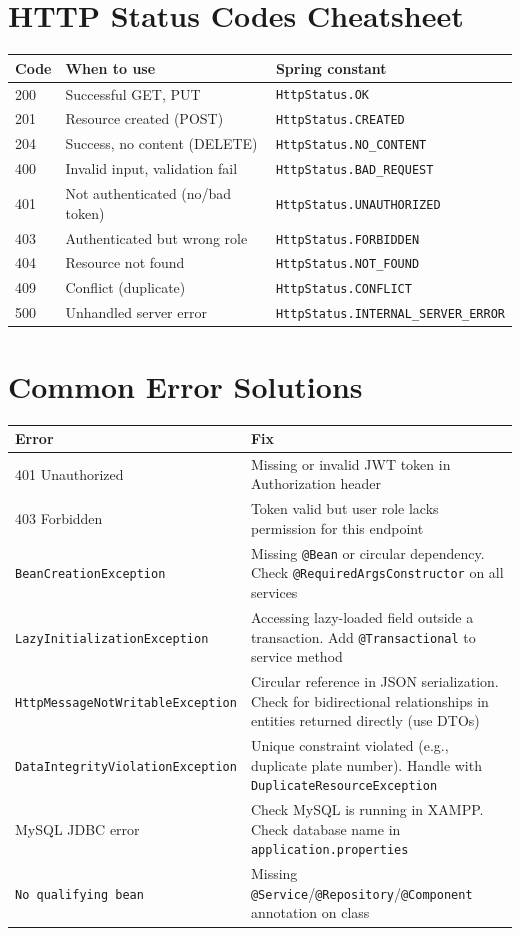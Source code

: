 \documentclass[12pt,a4paper]{report}
\newcommand{\code}[1]{\texttt{\textcolor{keywordblue}{#1}}}
\begin{document}
\section{HTTP Status Codes Cheatsheet}

\begin{tabularx}{\textwidth}{@{}lXl@{}}
\toprule
\textbf{Code} & \textbf{When to use} & \textbf{Spring constant} \\
\midrule
200 & Successful GET, PUT & \code{HttpStatus.OK} \\
201 & Resource created (POST) & \code{HttpStatus.CREATED} \\
204 & Success, no content (DELETE) & \code{HttpStatus.NO\_CONTENT} \\
400 & Invalid input, validation fail & \code{HttpStatus.BAD\_REQUEST} \\
401 & Not authenticated (no/bad token) & \code{HttpStatus.UNAUTHORIZED} \\
403 & Authenticated but wrong role & \code{HttpStatus.FORBIDDEN} \\
404 & Resource not found & \code{HttpStatus.NOT\_FOUND} \\
409 & Conflict (duplicate) & \code{HttpStatus.CONFLICT} \\
500 & Unhandled server error & \code{HttpStatus.INTERNAL\_SERVER\_ERROR} \\
\bottomrule
\end{tabularx}

\section{Common Error Solutions}

\begin{tabularx}{\textwidth}{@{}lX@{}}
\toprule
\textbf{Error} & \textbf{Fix} \\
\midrule
401 Unauthorized & Missing or invalid JWT token in Authorization header \\
403 Forbidden & Token valid but user role lacks permission for this endpoint \\
\code{BeanCreationException} & Missing \code{@Bean} or circular dependency. Check \code{@RequiredArgsConstructor} on all services \\
\code{LazyInitializationException} & Accessing lazy-loaded field outside a transaction. Add \code{@Transactional} to service method \\
\code{HttpMessageNotWritableException} & Circular reference in JSON serialization. Check for bidirectional relationships in entities returned directly (use DTOs) \\
\code{DataIntegrityViolationException} & Unique constraint violated (e.g., duplicate plate number). Handle with \code{DuplicateResourceException} \\
MySQL JDBC error & Check MySQL is running in XAMPP. Check database name in \code{application.properties} \\
\code{No qualifying bean} & Missing \code{@Service}/\code{@Repository}/\code{@Component} annotation on class \\
\bottomrule
\end{tabularx}
\end{document}
